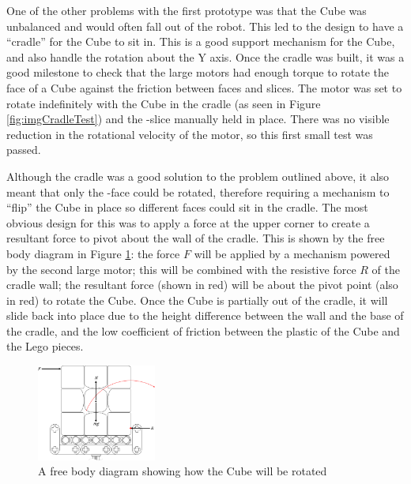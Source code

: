 \documentclass{report}
\newcommand{\face}[1]{\uppercase{\texttt{\formatmovesnospace{#1}}}-face}
\newcommand{\slice}[1]{\uppercase{\texttt{\formatmovesnospace{#1}}}-slice}
\begin{document}
	One of the other problems with the first prototype was that the Cube was unbalanced and would often fall out of the robot. This led to the design to have a \enquote{cradle} for the Cube to sit in. This is a good support mechanism for the Cube, and also handle the rotation about the Y axis. Once the cradle was built, it was a good milestone to check that the large motors had enough torque to rotate the face of a Cube against the friction between faces and slices. The motor was set to rotate indefinitely with the Cube in the cradle (as seen in Figure \ref{fig:imgCradleTest}) and the \slice{l-r} manually held in place. There was no visible reduction in the rotational velocity of the motor, so this first small test was passed.
	
	Although the cradle was a good solution to the problem outlined above, it also meant that only the \face{d} could be rotated, therefore requiring a mechanism to \enquote{flip} the Cube in place so different faces could sit in the cradle. The most obvious design for this was to apply a force at the upper corner to create a resultant force to pivot about the wall of the cradle. This is shown by the free body diagram in Figure \ref{fig:dwgCubeFreeBodyDiagram}: the force $F$ will be applied by a mechanism powered by the second large motor; this will be combined with the resistive force $R$ of the cradle wall; the resultant force (shown in red) will be about the pivot point (also in red) to rotate the Cube. Once the Cube is partially out of the cradle, it will slide back into place due to the height difference between the wall and the base of the cradle, and the low coefficient of friction between the plastic of the Cube and the Lego pieces.
    
	\begin{figure}[H]
    	\begin{center}
    		\includegraphics[width=0.35\textwidth]{Resources/Images/dwgCubeFreeBodyDiagram.png}
    		\caption{A free body diagram showing how the Cube will be rotated}
    		\label{fig:dwgCubeFreeBodyDiagram}
    	\end{center}
    \end{figure}
    
\end{document}
